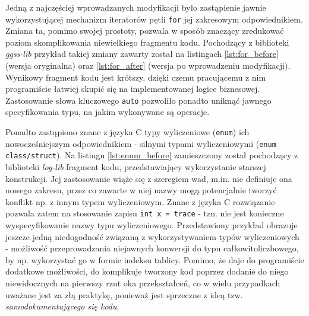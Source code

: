 Jedną z najczęściej wprowadzanych modyfikacji było zastąpienie jawnie wykorzystującej mechanizm iteratorów pętli \lstinline{for} jej zakresowym odpowiednikiem. Zmiana ta, pomimo swojej prostoty, pozwala w sposób znaczący zredukować poziom skomplikowania niewielkiego fragmentu kodu. Pochodzący z biblioteki \emph{ggss-lib} przykład takiej zmiany zawarty został na listingach \ref{lst:for_before} (wersja oryginalna) oraz \ref{lst:for_after} (wersja po wprowadzeniu modyfikacji). Wynikowy fragment kodu jest krótszy, dzięki czemu pracującemu z nim programiście łatwiej skupić się na implementowanej logice biznesowej. Zastosowanie słowa kluczowego \lstinline{auto} pozwoliło ponadto uniknąć jawnego specyfikowania typu, na jakim wykonywane są operacje.





Ponadto zastąpiono znane z języka C typy wyliczeniowe (\lstinline{enum}) ich nowocześniejszym odpowiednikiem - silnymi typami wyliczeniowymi (\lstinline{enum class/struct}). Na listingu \ref{lst:enum_before} zamieszczony został pochodzący z biblioteki \emph{log-lib} fragment kodu, przedstawiający wykorzystanie starszej konstrukcji. Jej zastosowanie wiąże się z szeregiem wad, m.in. nie definiuje ona nowego zakresu, przez co zawarte w niej nazwy mogą potencjalnie tworzyć konflikt np. z innym typem wyliczeniowym. Znane z języka C rozwiązanie pozwala zatem na stosowanie zapisu \lstinline{int x = trace} - tzn. nie jest konieczne wyspecyfikowanie nazwy typu wyliczeniowego. Przedstawiony przykład obrazuje jeszcze jedną niedogodność związaną z wykorzystywaniem typów wyliczeniowych - możliwość przeprowadzania niejawnych konwersji do typu całkowitoliczbowego, by np. wykorzystać go w formie indeksu tablicy. Pomimo, że daje do programiście dodatkowe możliwości, do komplikuje tworzony kod poprzez dodanie do niego niewidocznych na pierwszy rzut oka przekształceń, co w wielu przypadkach uważane jest za złą praktykę, ponieważ jest sprzeczne z ideą tzw. \emph{samodokumentującego się kodu}.

